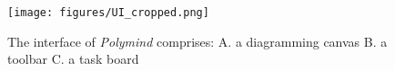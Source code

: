 \begin{figure}[ht]
\texttt{[image: figures/UI\_cropped.png]}
\caption{The interface of \textit{Polymind} comprises: A. a diagramming canvas B. a toolbar C. a task board}
\label{fig:UI}
\end{figure}